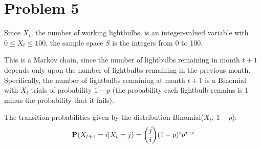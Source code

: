 \documentclass{homework}
\begin{document}
\section{Problem 5}
\begin{letterenum}
\item Since $X_t$, the number of working lightbulbs, is an integer-valued variable
with $0 \leq X_t \leq 100$, the sample space $S$ is the integers from 0 to 100.

\item This is a Markov chain, since the number of lightbulbs remaining in month
$t+1$ depends only upon the number of lightbulbs remaining in the previous month.
Specifically,
the number of lightbulbs remaining at month $t+1$ is a Binomial with $X_t$ trials of probability $1-p$ (the probability each lightbulb remains is 1 minus the probability
that it fails).

\item The transition probabilities given by the distribution Binomial($X_t$, $1-p$):
\begin{equation*}
    {\bf P}(X_{t+1} = i | X_t = j) = {j \choose i} (1 - p)^i p^{j-i}
\end{equation*}
\end{letterenum}
\end{document}
